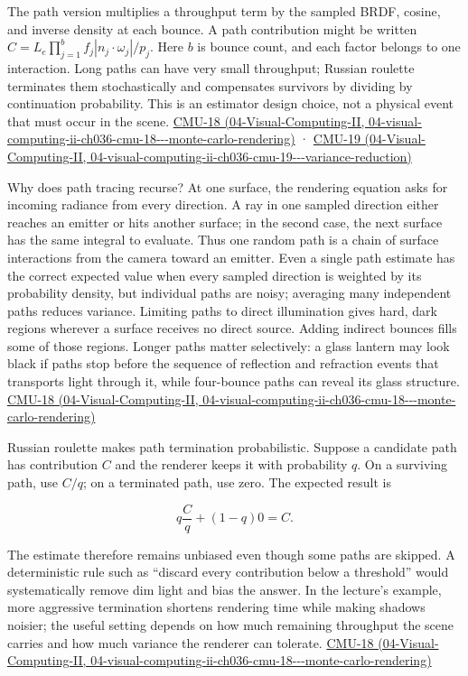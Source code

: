 The path version multiplies a throughput term by the sampled BRDF, cosine, and inverse density at each bounce. A path contribution might be written \(C= L_e\prod_{j=1}^b f_j|n_j\cdot\omega_j|/p_j\). Here \(b\) is bounce count, and each factor belongs to one interaction. Long paths can have very small throughput; Russian roulette terminates them stochastically and compensates survivors by dividing by continuation probability. This is an estimator design choice, not a physical event that must occur in the scene. \href{../04-Visual-Computing-II/main.pdf\#nameddest=04-visual-computing-ii-ch036-cmu-18---monte-carlo-rendering}{CMU-18 (04-Visual-Computing-II, 04-visual-computing-ii-ch036-cmu-18-\/-\/-monte-carlo-rendering)} · \href{../04-Visual-Computing-II/main.pdf\#nameddest=04-visual-computing-ii-ch036-cmu-19---variance-reduction}{CMU-19 (04-Visual-Computing-II, 04-visual-computing-ii-ch036-cmu-19-\/-\/-variance-reduction)}

Why does path tracing recurse? At one surface, the rendering equation asks for incoming radiance from every direction. A ray in one sampled direction either reaches an emitter or hits another surface; in the second case, the next surface has the same integral to evaluate. Thus one random path is a chain of surface interactions from the camera toward an emitter. Even a single path estimate has the correct expected value when every sampled direction is weighted by its probability density, but individual paths are noisy; averaging many independent paths reduces variance. Limiting paths to direct illumination gives hard, dark regions wherever a surface receives no direct source. Adding indirect bounces fills some of those regions. Longer paths matter selectively: a glass lantern may look black if paths stop before the sequence of reflection and refraction events that transports light through it, while four-bounce paths can reveal its glass structure. \href{../04-Visual-Computing-II/main.pdf\#nameddest=04-visual-computing-ii-ch036-cmu-18---monte-carlo-rendering}{CMU-18 (04-Visual-Computing-II, 04-visual-computing-ii-ch036-cmu-18-\/-\/-monte-carlo-rendering)}

Russian roulette makes path termination probabilistic. Suppose a candidate path has contribution \(C\) and the renderer keeps it with probability \(q\). On a surviving path, use \(C/q\); on a terminated path, use zero. The expected result is

\[
q\frac{C}{q}+(1-q)0=C.
\]

The estimate therefore remains unbiased even though some paths are skipped. A deterministic rule such as ``discard every contribution below a threshold'' would systematically remove dim light and bias the answer. In the lecture's example, more aggressive termination shortens rendering time while making shadows noisier; the useful setting depends on how much remaining throughput the scene carries and how much variance the renderer can tolerate. \href{../04-Visual-Computing-II/main.pdf\#nameddest=04-visual-computing-ii-ch036-cmu-18---monte-carlo-rendering}{CMU-18 (04-Visual-Computing-II, 04-visual-computing-ii-ch036-cmu-18-\/-\/-monte-carlo-rendering)}

